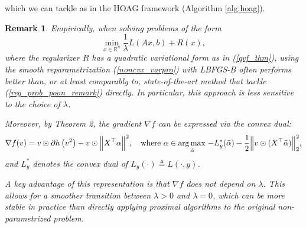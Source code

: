 \documentclass[11pt, twoside]{report}
\newtheorem{remark}{Remark}[theorem]
\begin{document}
which we can tackle as in the HOAG framework (Algorithm \ref{alg:hoag}). 

\begin{remark}
    Empirically, when solving problems of the form
    \begin{equation} \label{reg_prob_poon_remark}
        \min_{x \in \mathbb{R}^n} \frac{1}{\lambda} L(Ax,b) + R(x),
    \end{equation}
    where the regularizer $R$ has a quadratic variational form as in (\ref{qvf_thm}), using the smooth reparametrization (\ref{noncvx_varpro}) with LBFGS-B often performs better than, or at least comparably to, state-of-the-art method that tackle (\ref{reg_prob_poon_remark}) directly. In particular, this approach is less sensitive to the choice of $\lambda$.

    Moreover, by Theorem 2\cite{poon}, the gradient $\nabla f$ can be expressed via the convex dual:
    \begin{equation*}
        \nabla f(v) = v \odot \partial h\left(v^2\right) - v \odot \Big\|X^\top \alpha\Big\|^2,
        \quad \text{where } \alpha \in \operatorname*{arg\, max \,}_{\tilde{\alpha}} - L_y^*(\tilde{\alpha}) - \frac{1}{2}\Big\|v \odot (X^\top \tilde{\alpha})\Big\|_2^2,
    \end{equation*}
    and $L_y^*$ denotes the convex dual of $L_y(\cdot) \triangleq L(\cdot,y)$. 

    A key advantage of this representation is that $\nabla f$ does not depend on $\lambda$. This allows for a smoother transition between $\lambda > 0$ and $\lambda = 0$, which can be more stable in practice than directly applying proximal algorithms to the original non-parametrized problem.
\end{remark}
\end{document}
